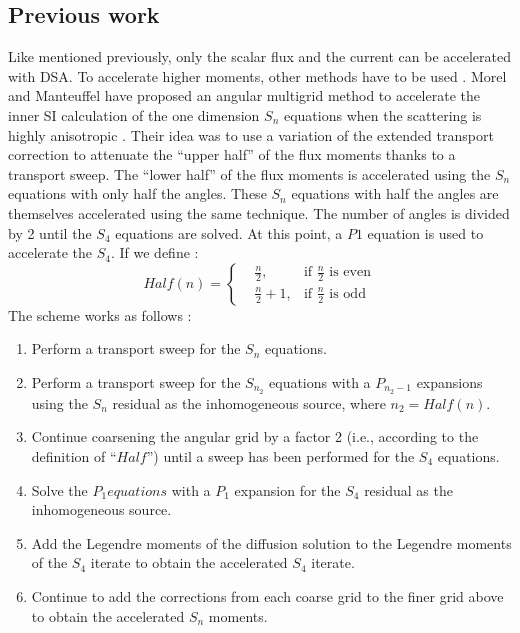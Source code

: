 \subsection{Previous work}
Like mentioned previously, only the scalar flux and the current can be
accelerated with DSA. To accelerate higher moments, other methods have to be
used \cite{kassem,multigrid_1d}. Morel and Manteuffel have proposed an angular 
multigrid method to accelerate the inner SI calculation of the one dimension 
$S_n$ equations when the scattering is highly anisotropic 
\cite{multigrid_1d}. Their idea was to use a variation of the extended
transport correction \cite{lathrop} to attenuate the ``upper half'' of the
flux moments thanks to a transport sweep. The ``lower half'' of the flux
moments is accelerated using the $S_n$ equations with only half the angles.
These $S_n$ equations with half the angles are themselves accelerated using the same
technique. The number of angles is divided by 2 until the $S_4$ equations are
solved. At this point, a $P1$ equation is used to accelerate the $S_4$. If we define :
\begin{equation}
Half(n) = \left\{
\begin{aligned}
&\frac{n}{2}, &\textrm{if $\frac{n}{2}$ is even}\\
&\frac{n}{2}+1, &\textrm{if $\frac{n}{2}$ is odd}
\end{aligned}
\right.
\end{equation}
The scheme works as follows : 
\begin{enumerate}
\item Perform a transport sweep for the $S_n$ equations.
\item Perform a transport sweep for the $S_{n_2}$ equations with a $P_{n_2-1}$
expansions using the $S_n$ residual as the inhomogeneous source, where
$n_2=Half(n)$.
\item Continue coarsening the angular grid by a factor 2 (i.e., according to
the definition of ``$Half$'') until a sweep has been performed for the $S_4$
equations.
\item Solve the $P_1 equations$ with a $P_1$ expansion for the $S_4$
residual as the inhomogeneous source.
\item Add the Legendre moments of the diffusion solution to the Legendre
moments of the $S_4$ iterate to obtain the accelerated $S_4$ iterate.
\item Continue to add the corrections from each coarse grid to the finer grid
above to obtain the accelerated $S_n$ moments.
\end{enumerate}
